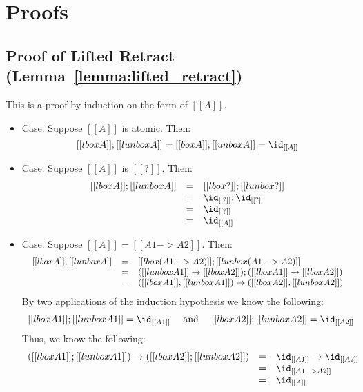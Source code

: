 

\section{Proofs}
\label{sec:proofs}

\subsection{Proof of Lifted Retract (Lemma~\ref{lemma:lifted_retract})}
\label{subsec:proof_of_lifted_retract}
This is a proof by induction on the form of $[[A]]$.

\begin{itemize}
\item[] Case. Suppose $[[A]]$ is atomic.  Then:
  \[
    [[lbox A]];[[lunbox A]] = [[box A]];[[unbox A]] = \id_{[[A]]}
    \]
    
  \item[] Case. Suppose $[[A]]$ is $[[?]]$.  Then:
    \[
    \begin{array}{lll}
      [[lbox A]];[[lunbox A]] & = & [[lbox ?]];[[lunbox ?]]\\
      & = & \id_{[[?]]};\id_{[[?]]}\\
      & = & \id_{[[?]]}\\
      & = & \id_{[[A]]}
    \end{array}
    \]

  \item[] Case. Suppose $[[A]] = [[A1 -> A2]]$.  Then:
    \[\small
    \begin{array}{lll}
      [[lbox A]];[[lunbox A]]
      & = & [[lbox (A1 -> A2)]];[[lunbox (A1 -> A2)]]\\
      & = & ([[lunbox A1]] \to [[lbox A2]]);([[lbox A1]] \to [[lbox A2]])\\
      & = & ([[lbox A1]];[[lunbox A1]]) \to ([[lbox A2]];[[lunbox A2]])\\
    \end{array}
    \]
    By two applications of the induction hypothesis we know the
    following:
    \[
    \begin{array}{lll}
      [[lbox A1]];[[lunbox A1]] = \id_{[[A1]]} & \text{ and } & [[lbox A2]];[[lunbox A2]] = \id_{[[A2]]}
    \end{array}
    \]
    Thus, we know the following:
    \[
    \begin{array}{lll}
      ([[lbox A1]];[[lunbox A1]]) \to ([[lbox A2]];[[lunbox A2]])
      & = & \id_{[[A1]]} \to \id_{[[A2]]}\\
      & = & \id_{[[A1 -> A2]]}\\
      & = & \id_{[[A]]}
    \end{array}
    \]


\end{itemize}

